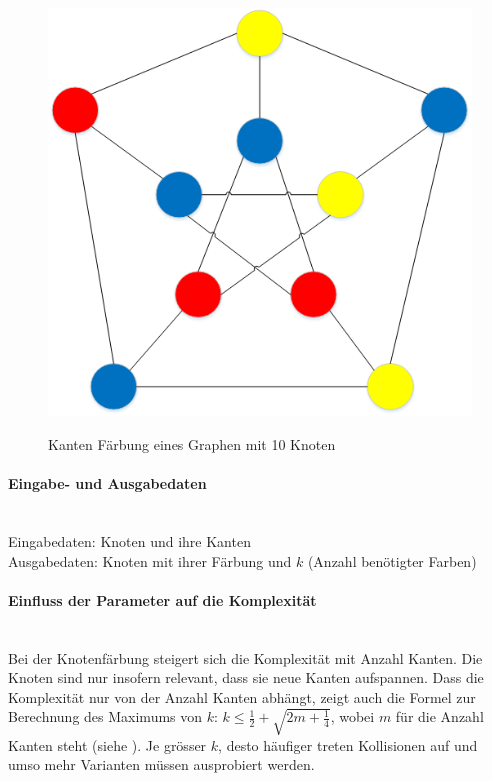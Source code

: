 \begin{figure}[ht]
{  \includegraphics[scale=0.5]{images/visio/graph_faerbung_correct.png}
  \label{fig:graph_faerbung_correct}
}
\caption[Knotenfärbung eines Graphen mit 10 Knoten]{Kanten Färbung eines Graphen mit 10 Knoten \selfmade{}}
\label{fig:graph_faerbung}
\end{figure}

\FloatBarrier 
	\paragraph{Eingabe- und Ausgabedaten}\mbox{}\\
	Eingabedaten: Knoten und ihre Kanten\\
	Ausgabedaten: Knoten mit ihrer Färbung und $k$ (Anzahl benötigter Farben)

	\paragraph{Einfluss der Parameter auf die Komplexität}\mbox{}\\
	Bei der Knotenfärbung steigert sich die Komplexität mit Anzahl Kanten. Die Knoten sind nur insofern relevant, dass sie neue Kanten aufspannen. Dass die Komplexität nur von der Anzahl Kanten 
	abhängt, zeigt auch die Formel zur Berechnung des Maximums von $k$: $k \le \frac{1}{2} + \sqrt{2m + \frac{1}{4}}$, wobei $m$ für die Anzahl Kanten steht 
	(siehe \cite{seminar_rainer_graph}). Je grösser $k$, desto häufiger treten Kollisionen auf und umso mehr Varianten müssen ausprobiert werden.

